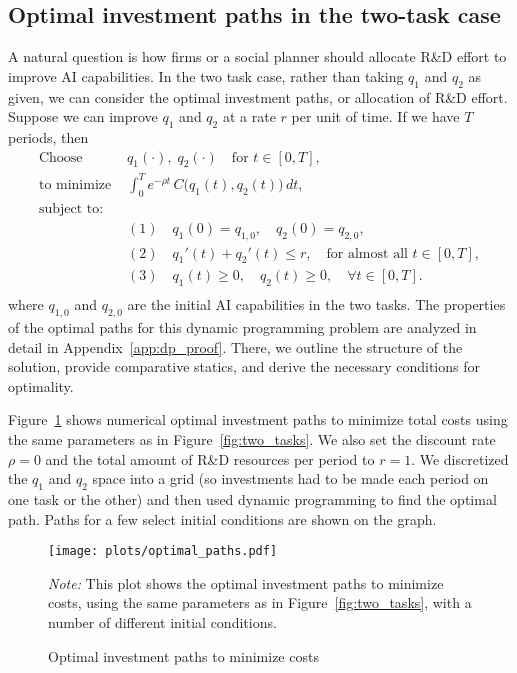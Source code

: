 \documentclass{article}
\theoremstyle{plain}
\theoremstyle{plain}
\begin{document}
\subsection{Optimal investment paths in the two-task case}
A natural question is how firms or a social planner should allocate R\&D effort to improve AI capabilities.
In the two task case, rather than taking \(q_1\) and \(q_2\) as given, we can consider the optimal investment paths, or allocation of R\&D effort.
Suppose we can improve \(q_1\) and \(q_2\) at a rate \(r\) per unit of time.
If we have \(T\) periods, then 
\[
\begin{aligned}
\text{Choose } &q_1(\cdot), \; q_2(\cdot) \quad \text{for } t \in [0, T],\\[1em]
\text{to minimize } &
   \int_{0}^{T}
   e^{-\rho t} \, C\bigl(q_1(t), q_2(t)\bigr) \, dt, \\[1em]
\text{subject to:} & \\[-1em]
&(1)\quad q_1(0) = q_{1,0}, \quad q_2(0) = q_{2,0}, \\[6pt]
&(2)\quad q_1'(t) + q_2'(t) \le r, \quad \text{for almost all } t \in [0, T], \\[6pt]
&(3)\quad q_1(t) \geq 0, \quad q_2(t) \geq 0, \quad \forall t \in [0, T]. \\[6pt]
\end{aligned}
\label{eq:dp_problem}
\]
where \(q_{1,0}\) and \(q_{2,0}\) are the initial AI capabilities in the two tasks.
The properties of the optimal paths for this dynamic programming problem are analyzed in detail in Appendix~\ref{app:dp_proof}. 
There, we outline the structure of the solution, provide comparative statics, and derive the necessary conditions for optimality.

Figure~\ref{fig:optimal_paths} shows numerical optimal investment paths to minimize total costs using the same parameters as in Figure~\ref{fig:two_tasks}.
We also set the discount rate \(\rho = 0\) and the total amount of R\&D resources per period to \(r = 1\).
We discretized the \(q_1\) and \(q_2\) space into a grid (so investments had to be made each period on one task or the other) and then used dynamic programming to find the optimal path.
Paths for a few select initial conditions are shown on the graph.

\begin{figure}
  \begin{center}
  \caption{Optimal investment paths to minimize costs} \label{fig:optimal_paths}
  \texttt{[image: plots/optimal\_paths.pdf]}
  \end{center}
  \begin{footnotesize}
  \emph{Note:} This plot shows the optimal investment paths to minimize costs, using the same parameters as in Figure~\ref{fig:two_tasks}, with a number of different initial conditions.
\end{footnotesize}
\end{figure}
\end{document}
